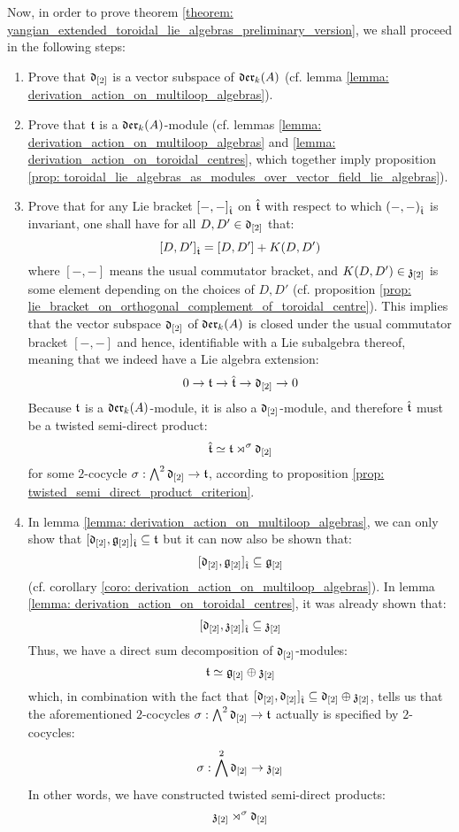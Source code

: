         Now, in order to prove theorem \ref{theorem: yangian_extended_toroidal_lie_algebras_preliminary_version}, we shall proceed in the following steps:
        \begin{enumerate}
            \item Prove that $\mathfrak{d}_{[2]}$ is a vector subspace of $\mathfrak{der}_k(A)$ (cf. lemma \ref{lemma: derivation_action_on_multiloop_algebras}).
            \item Prove that $\mathfrak{t}$ is a $\mathfrak{der}_k(A)$-module (cf. lemmas \ref{lemma: derivation_action_on_multiloop_algebras} and \ref{lemma: derivation_action_on_toroidal_centres}, which together imply proposition \ref{prop: toroidal_lie_algebras_as_modules_over_vector_field_lie_algebras}).
            \item Prove that for any Lie bracket $[-, -]_{\hat{\mathfrak{t}}}$ on $\hat{\mathfrak{t}}$ with respect to which $(-, -)_{\hat{\mathfrak{t}}}$ is invariant, one shall have for all $D, D' \in \mathfrak{d}_{[2]}$ that:
                $$[D, D']_{\hat{\mathfrak{t}}} = [D, D'] + K(D, D')$$
            where $[-, -]$ means the usual commutator bracket, and $K(D, D') \in \mathfrak{z}_{[2]}$ is some element depending on the choices of $D, D'$ (cf. proposition \ref{prop: lie_bracket_on_orthogonal_complement_of_toroidal_centre}). This implies that the vector subspace $\mathfrak{d}_{[2]}$ of $\mathfrak{der}_k(A)$ is closed under the usual commutator bracket $[-, -]$ and hence, identifiable with a Lie subalgebra thereof, meaning that we indeed have a Lie algebra extension:
                $$0 \to \mathfrak{t} \to \hat{\mathfrak{t}} \to \mathfrak{d}_{[2]} \to 0$$
            Because $\mathfrak{t}$ is a $\mathfrak{der}_k(A)$-module, it is also a $\mathfrak{d}_{[2]}$-module, and therefore $\hat{\mathfrak{t}}$ must be a twisted semi-direct product:
                $$\hat{\mathfrak{t}} \simeq \mathfrak{t} \rtimes^{\sigma} \mathfrak{d}_{[2]}$$
            for some $2$-cocycle $\sigma: \bigwedge^2 \mathfrak{d}_{[2]} \to \mathfrak{t}$, according to proposition \ref{prop: twisted_semi_direct_product_criterion}.
            \item In lemma \ref{lemma: derivation_action_on_multiloop_algebras}, we can only show that $[\mathfrak{d}_{[2]}, \mathfrak{g}_{[2]}]_{\hat{\mathfrak{t}}} \subseteq \mathfrak{t}$ but it can now also be shown that:
                $$[\mathfrak{d}_{[2]}, \mathfrak{g}_{[2]}]_{\hat{\mathfrak{t}}} \subseteq \mathfrak{g}_{[2]}$$
            (cf. corollary \ref{coro: derivation_action_on_multiloop_algebras}). In lemma \ref{lemma: derivation_action_on_toroidal_centres}, it was already shown that:
                $$[\mathfrak{d}_{[2]}, \mathfrak{z}_{[2]}]_{\hat{\mathfrak{t}}} \subseteq \mathfrak{z}_{[2]}$$
            Thus, we have a direct sum decomposition of $\mathfrak{d}_{[2]}$-modules:
                $$\mathfrak{t} \simeq \mathfrak{g}_{[2]} \oplus \mathfrak{z}_{[2]}$$
            which, in combination with the fact that $[\mathfrak{d}_{[2]}, \mathfrak{d}_{[2]}]_{\hat{\mathfrak{t}}} \subseteq \mathfrak{d}_{[2]} \oplus \mathfrak{z}_{[2]}$, tells us that the aforementioned $2$-cocycles $\sigma: \bigwedge^2 \mathfrak{d}_{[2]} \to \mathfrak{t}$ actually is specified by $2$-cocycles:
                $$\sigma: \bigwedge^2 \mathfrak{d}_{[2]} \to \mathfrak{z}_{[2]}$$
            In other words, we have constructed twisted semi-direct products:
                $$\mathfrak{z}_{[2]} \rtimes^{\sigma} \mathfrak{d}_{[2]}$$
        \end{enumerate}

